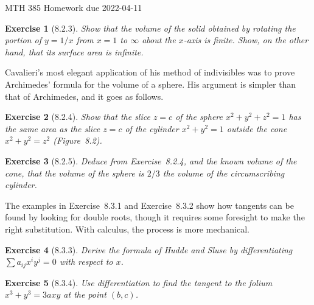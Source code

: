 \documentclass[12pt]{article}
\theoremstyle{plain}
\newtheorem{ex}{Exercise}
\begin{document}
MTH 385 \qquad Homework due 2022-04-11

\begin{ex} [8.2.3]
  Show that the volume of the solid obtained by rotating the portion of $y=1/x$ from $x=1$ to $\infty$ about the $x$-axis is finite. Show, on the other hand, that its surface area is infinite.
\end{ex}


Cavalieri's most elegant application of his method of indivisibles was to prove Archimedes' formula for the volume of a sphere. His argument is simpler than that of Archimedes, and it goes as follows.

\begin{ex} [8.2.4]
  Show that the slice $z=c$ of the sphere $x^2+y^2+z^2=1$ has the same area as the slice $z=c$ of the cylinder $  x^2+y^2=1$ outside the cone $x^2+y^2=z^2$ (Figure~8.2).
\end{ex}

\begin{ex} [8.2.5]
  Deduce from Exercise~8.2.4, and the known volume of the cone, that the volume of the sphere is $2/3$ the volume of the circumscribing cylinder.
\end{ex}

The examples in Exercise~8.3.1 and Exercise~8.3.2 show how tangents can be found by looking for double roots, though it requires some foresight to make the right substitution. With calculus, the process is more mechanical.

\begin{ex} [8.3.3]
  Derive the formula of Hudde and Sluse by differentiating $\sum a_{ij}x^iy^j=0$ with respect to $x$.
\end{ex}

\begin{ex} [8.3.4]
  Use differentiation to find the tangent to the folium $x^3+y^3=3axy$ at the point $(b,c)$.
\end{ex}
\end{document}
